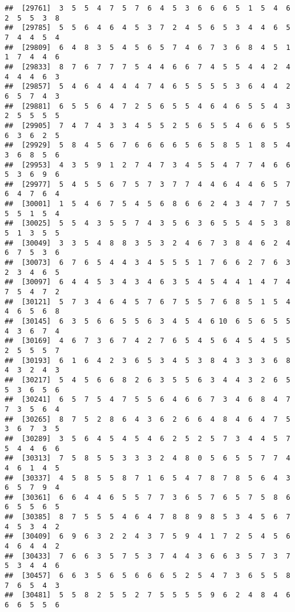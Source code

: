 \documentclass[
]{book}
\begin{document}
\begin{verbatim}
##  [29761]  3  5  5  4  7  5  7  6  4  5  3  6  6  6  5  1  5  4  6  2  5  5  3  8
##  [29785]  5  5  6  4  6  4  5  3  7  2  4  5  6  5  3  4  4  6  5  7  4  4  5  4
##  [29809]  6  4  8  3  5  4  5  6  5  7  4  6  7  3  6  8  4  5  1  1  7  4  4  6
##  [29833]  8  7  6  7  7  7  5  4  4  6  6  7  4  5  5  4  4  2  4  4  4  4  6  3
##  [29857]  5  4  6  4  4  4  4  7  4  6  5  5  5  5  3  6  4  4  2  6  5  7  4  3
##  [29881]  6  5  5  6  4  7  2  5  6  5  5  4  6  4  6  5  5  4  3  2  5  5  5  5
##  [29905]  7  4  7  4  3  3  4  5  5  2  5  6  5  5  4  6  6  5  5  6  3  6  2  5
##  [29929]  5  8  4  5  6  7  6  6  6  6  5  6  5  8  5  1  8  5  4  3  6  8  5  6
##  [29953]  4  3  5  9  1  2  7  4  7  3  4  5  5  4  7  7  4  6  6  5  3  6  9  6
##  [29977]  5  4  5  5  6  7  5  7  3  7  7  4  4  6  4  4  6  5  7  6  4  7  6  4
##  [30001]  1  5  4  6  7  5  4  5  6  8  6  6  2  4  3  4  7  7  5  5  5  1  5  4
##  [30025]  5  5  4  3  5  5  7  4  3  5  6  3  6  5  5  4  5  3  8  5  1  3  5  5
##  [30049]  3  3  5  4  8  8  3  5  3  2  4  6  7  3  8  4  6  2  4  6  7  5  3  6
##  [30073]  6  7  6  5  4  4  3  4  5  5  5  1  7  6  6  2  7  6  3  2  3  4  6  5
##  [30097]  6  4  4  5  3  4  3  4  6  3  5  4  5  4  4  1  4  7  4  7  5  4  7  2
##  [30121]  5  7  3  4  6  4  5  7  6  7  5  5  7  6  8  5  1  5  4  4  6  5  6  8
##  [30145]  6  3  5  6  6  5  5  6  3  4  5  4  6 10  6  5  6  5  5  4  3  6  7  4
##  [30169]  4  6  7  3  6  7  4  2  7  6  5  4  5  6  4  5  4  5  5  2  5  5  5  7
##  [30193]  6  1  6  4  2  3  6  5  3  4  5  3  8  4  3  3  3  6  8  4  3  2  4  3
##  [30217]  5  4  5  6  6  8  2  6  3  5  5  6  3  4  4  3  2  6  5  5  3  6  5  6
##  [30241]  6  5  7  5  4  7  5  5  6  4  6  6  7  3  4  6  8  4  7  7  3  5  6  4
##  [30265]  8  7  5  2  8  6  4  3  6  2  6  6  4  8  4  6  4  7  5  3  6  7  3  5
##  [30289]  3  5  6  4  5  4  5  4  6  2  5  2  5  7  3  4  4  5  7  5  4  4  6  6
##  [30313]  7  5  8  5  5  3  3  3  2  4  8  0  5  6  5  5  7  7  4  4  6  1  4  5
##  [30337]  4  5  8  5  5  8  7  1  6  5  4  7  8  7  8  5  6  4  3  6  5  7  9  4
##  [30361]  6  6  4  4  6  5  5  7  7  3  6  5  7  6  5  7  5  8  6  6  5  5  6  5
##  [30385]  8  7  5  5  5  4  6  4  7  8  8  9  8  5  3  4  5  6  7  4  5  3  4  2
##  [30409]  6  9  6  3  2  2  4  3  7  5  9  4  1  7  2  5  4  5  6  4  6  4  4  2
##  [30433]  7  6  6  3  5  7  5  3  7  4  4  3  6  6  3  5  7  3  7  5  3  4  4  6
##  [30457]  6  6  3  5  6  5  6  6  6  5  2  5  4  7  3  6  5  5  8  7  6  5  4  3
##  [30481]  5  5  8  2  5  5  2  7  5  5  5  5  9  6  2  4  8  4  6  6  6  5  5  6

\end{verbatim}
\end{document}
